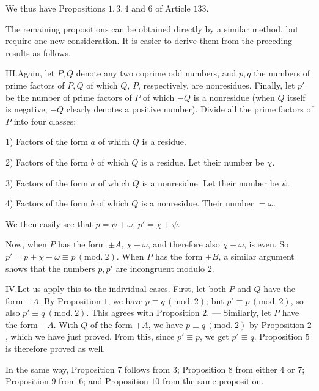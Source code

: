 We thus have Propositions $1,3,4$ and $6$ of Article $133$.

The remaining propositions can be obtained directly by a similar method, but require one new consideration. It is easier to derive them from the preceding results as follows.

III.\quad Again, let $P,Q$ denote any two coprime odd numbers, and $p,q$ the numbers of prime factors of $P,Q$ of which $Q$, $P$, respectively, are nonresidues. Finally, let $p'$ be the number of prime factors of $P$ of which $-Q$ is a nonresidue (when $Q$ itself is negative, $-Q$ clearly denotes a positive number). Divide all the prime factors of $P$ into four classes:

1) Factors of the form $a$ of which $Q$ is a residue.

2) Factors of the form $b$ of which $Q$ is a residue. Let their number be $\chi$.

3) Factors of the form $a$ of which $Q$ is a nonresidue. Let their number be $\psi$.

4) Factors of the form $b$ of which $Q$ is a nonresidue. Their number $=\omega$.

We then easily see that $p=\psi+\omega$, $p'=\chi+\psi$.

Now, when $P$ has the form $\pm A$, $\chi+\omega$, and therefore also $\chi-\omega$, is even. So $p'=p+\chi-\omega\equiv p\, (\mathrm{mod.}\ 2)$. When $P$ has the form $\pm B$, a similar argument shows that the numbers $p,p'$ are incongruent modulo $2$.

IV.\quad Let us apply this to the individual cases. First, let both $P$ and $Q$ have the form $+A$. By Proposition $1$, we have $p\equiv q\, (\mathrm{mod.}\ 2)$; but $p'\equiv p\, (\mathrm{mod.}\ 2)$, so also $p'\equiv q\ (\mathrm{mod.}\ 2)$. This agrees with Proposition $2$. --- Similarly, let $P$ have the form $-A$. With $Q$ of the form $+A$, we have $p\equiv q\, (\mathrm{mod.}\ 2)$ by Proposition $2$, which we have just proved. From this, since $p'\equiv p$, we get $p'\equiv q$. Proposition $5$ is therefore proved as well.

In the same way, Proposition $7$ follows from $3$; Proposition $8$ from either $4$ or $7$; Proposition $9$ from $6$; and Proposition $10$ from the same proposition.
